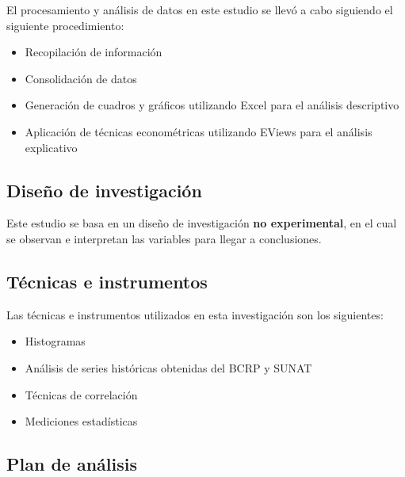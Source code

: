 \documentclass[
  letterpaper,
  DIV=11,
  numbers=noendperiod]{scrartcl}
\providecommand{\tightlist}{%
  \setlength{\itemsep}{0pt}\setlength{\parskip}{0pt}}\usepackage{longtable,booktabs,array}
\begin{document}
El procesamiento y análisis de datos en este estudio se llevó a cabo
siguiendo el siguiente procedimiento:

\begin{itemize}
\tightlist
\item
  Recopilación de información
\item
  Consolidación de datos
\item
  Generación de cuadros y gráficos utilizando Excel para el análisis
  descriptivo
\item
  Aplicación de técnicas econométricas utilizando EViews para el
  análisis explicativo
\end{itemize}

\hypertarget{diseuxf1o-de-investigaciuxf3n}{%
\subsection{Diseño de
investigación}\label{diseuxf1o-de-investigaciuxf3n}}

Este estudio se basa en un diseño de investigación \textbf{no
experimental}, en el cual se observan e interpretan las variables para
llegar a conclusiones.

\hypertarget{tuxe9cnicas-e-instrumentos}{%
\subsection{Técnicas e instrumentos}\label{tuxe9cnicas-e-instrumentos}}

Las técnicas e instrumentos utilizados en esta investigación son los
siguientes:

\begin{itemize}
\tightlist
\item
  Histogramas
\item
  Análisis de series históricas obtenidas del BCRP y SUNAT
\item
  Técnicas de correlación
\item
  Mediciones estadísticas
\end{itemize}

\hypertarget{plan-de-anuxe1lisis}{%
\subsection{Plan de análisis}\label{plan-de-anuxe1lisis}}
\end{document}
